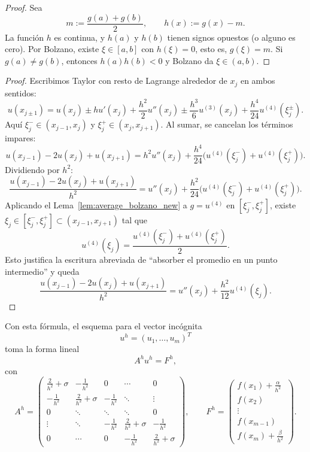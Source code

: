 \documentclass[a4paper,11pt]{report}
\begin{document}
\begin{proof}
Sea
\[
m:=\frac{g(a)+g(b)}{2},
\qquad
h(x):=g(x)-m.
\]
La función $h$ es continua, y $h(a)$ y $h(b)$ tienen signos opuestos (o alguno es cero). Por Bolzano, existe $\xi\in[a,b]$ con $h(\xi)=0$, esto es, $g(\xi)=m$. Si $g(a)\neq g(b)$, entonces $h(a)h(b)<0$ y Bolzano da $\xi\in(a,b)$.
\end{proof}

\begin{proof}
Escribimos Taylor con resto de Lagrange alrededor de $x_j$ en ambos sentidos:
\[
  u(x_{j\pm1})=u(x_j)\pm h u'(x_j)+\frac{h^2}{2}u''(x_j)\pm\frac{h^3}{6}u^{(3)}(x_j)+\frac{h^4}{24}u^{(4)}(\xi_j^{\pm}).
\]
Aquí $\xi_j^-\in(x_{j-1},x_j)$ y $\xi_j^+\in(x_j,x_{j+1})$. Al sumar, se cancelan los términos impares:
\[
  u(x_{j-1})-2u(x_j)+u(x_{j+1})
  =h^2u''(x_j)+\frac{h^4}{24}\bigl(u^{(4)}(\xi_j^-)+u^{(4)}(\xi_j^+)\bigr).
\]
Dividiendo por $h^2$:
\[
\frac{u(x_{j-1})-2u(x_j)+u(x_{j+1})}{h^2}
=u''(x_j)+\frac{h^2}{24}\bigl(u^{(4)}(\xi_j^-)+u^{(4)}(\xi_j^+)\bigr).
\]
Aplicando el Lema~\ref{lem:average_bolzano_new} a $g=u^{(4)}$ en $[\xi_j^-,\xi_j^+]$, existe $\xi_j\in[\xi_j^-,\xi_j^+]\subset(x_{j-1},x_{j+1})$ tal que
\[
u^{(4)}(\xi_j)=\frac{u^{(4)}(\xi_j^-)+u^{(4)}(\xi_j^+)}{2}.
\]
Esto justifica la escritura abreviada de ``absorber el promedio en un punto intermedio'' y queda
\[
\frac{u(x_{j-1})-2u(x_j)+u(x_{j+1})}{h^2}
=u''(x_j)+\frac{h^2}{12}u^{(4)}(\xi_j).
\]
\end{proof}

Con esta fórmula, el esquema para el vector incógnita
\[
  u^h=(u_1,\dots,u_m)^T
\]
toma la forma lineal
\[
  A^h u^h=F^h,
\]
con
\[
  A^h=
  \begin{pmatrix}
    \frac{2}{h^2}+\sigma & -\frac{1}{h^2} & 0 & \cdots & 0\\
    -\frac{1}{h^2} & \frac{2}{h^2}+\sigma & -\frac{1}{h^2} & \ddots & \vdots\\
    0 & \ddots & \ddots & \ddots & 0\\
    \vdots & \ddots & -\frac{1}{h^2} & \frac{2}{h^2}+\sigma & -\frac{1}{h^2}\\
    0 & \cdots & 0 & -\frac{1}{h^2} & \frac{2}{h^2}+\sigma
  \end{pmatrix},
\qquad
  F^h=
  \begin{pmatrix}
    f(x_1)+\frac{\alpha}{h^2}\\
    f(x_2)\\
    \vdots\\
    f(x_{m-1})\\
    f(x_m)+\frac{\beta}{h^2}
  \end{pmatrix}.
\] 
\end{document}
